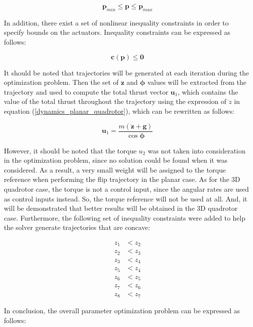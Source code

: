 \documentclass{thesisreport}
\begin{document}
\begin{equation}
	\bm{p}_{min} \leq \bm{p} \leq \bm{p}_{max}
\end{equation}

In addition, there exist a set of nonlinear inequality  constraints in order to specify bounds on the actuators. Inequality constraints can be expressed as follows:

\begin{equation}
	\bm{c}(\bm{p}) \leq \bm{0}
\end{equation}

It should be noted that trajectories will be generated at each iteration during the optimization problem. Then the set of $\ddot{\bm{z}}$ and $\bm{\phi}$ values will be extracted from the trajectory and used to compute the total thrust vector $\bm{u}_1$, which contains the value of the total thrust throughout the trajectory using the expression of $\ddot{z}$ in equation (\ref{dynamics_planar_quadrotor}), which can be rewritten as follows:  

\begin{equation}
	\bm{u}_1 = \frac{m(\ddot{\bm{z}} + \bm{g})}{\cos \bm{\phi}}
\end{equation}

However, it should be noted that the torque $u_2$ was not taken into consideration in the optimization problem, since no solution could be found when it was considered. As a result, a very small weight will be assigned to the torque reference when performing the flip trajectory in the planar case. As for the 3D quadrotor case, the torque is not a control input, since the angular rates are used as control inputs instead. So, the torque reference will not be used at all. And, it will be demonstrated that better results will be obtained in the 3D quadrotor case.
Furthermore, the following set of inequality constraints were added to help the solver generate trajectories that are concave:

\begin{align}
	z_1 &< z_2 \\
	z_2 &< z_3 \\
	z_3 &< z_4 \\
	z_5 &< z_4 \\
	z_6 &< z_5 \\
	z_7 &< z_6 \\
	z_8 &< z_7
\end{align}

In conclusion, the overall parameter optimization problem can be expressed as follows: 
\end{document}
